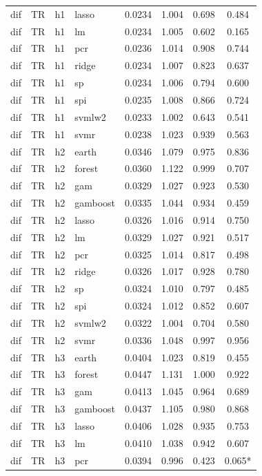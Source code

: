\begin{ThreePartTable}
\begin{longtable}[t]{llclcccc}
dif & TR & h1 & lasso & 0.0234 & 1.004 & 0.698 & 0.484\\
dif & TR & h1 & lm & 0.0234 & 1.005 & 0.602 & 0.165\\
dif & TR & h1 & pcr & 0.0236 & 1.014 & 0.908 & 0.744\\
dif & TR & h1 & ridge & 0.0234 & 1.007 & 0.823 & 0.637\\
dif & TR & h1 & sp & 0.0234 & 1.006 & 0.794 & 0.600\\
dif & TR & h1 & spi & 0.0235 & 1.008 & 0.866 & 0.724\\
dif & TR & h1 & svmlw2 & 0.0233 & 1.002 & 0.643 & 0.541\\
dif & TR & h1 & svmr & 0.0238 & 1.023 & 0.939 & 0.563\\
\addlinespace
dif & TR & h2 & earth & 0.0346 & 1.079 & 0.975 & 0.836\\
dif & TR & h2 & forest & 0.0360 & 1.122 & 0.999 & 0.707\\
dif & TR & h2 & gam & 0.0329 & 1.027 & 0.923 & 0.530\\
dif & TR & h2 & gamboost & 0.0335 & 1.044 & 0.934 & 0.459\\
dif & TR & h2 & lasso & 0.0326 & 1.016 & 0.914 & 0.750\\
dif & TR & h2 & lm & 0.0329 & 1.027 & 0.921 & 0.517\\
dif & TR & h2 & pcr & 0.0325 & 1.014 & 0.817 & 0.498\\
dif & TR & h2 & ridge & 0.0326 & 1.017 & 0.928 & 0.780\\
dif & TR & h2 & sp & 0.0324 & 1.010 & 0.797 & 0.485\\
dif & TR & h2 & spi & 0.0324 & 1.012 & 0.852 & 0.607\\
dif & TR & h2 & svmlw2 & 0.0322 & 1.004 & 0.704 & 0.580\\
dif & TR & h2 & svmr & 0.0336 & 1.048 & 0.997 & 0.956\\
\addlinespace
dif & TR & h3 & earth & 0.0404 & 1.023 & 0.819 & 0.455\\
dif & TR & h3 & forest & 0.0447 & 1.131 & 1.000 & 0.922\\
dif & TR & h3 & gam & 0.0413 & 1.045 & 0.964 & 0.689\\
dif & TR & h3 & gamboost & 0.0437 & 1.105 & 0.980 & 0.868\\
dif & TR & h3 & lasso & 0.0406 & 1.028 & 0.935 & 0.753\\
dif & TR & h3 & lm & 0.0410 & 1.038 & 0.942 & 0.607\\
dif & TR & h3 & pcr & 0.0394 & 0.996 & 0.423 & 0.065*\\

\end{longtable}
\end{ThreePartTable}
